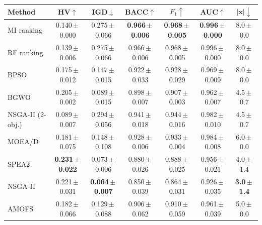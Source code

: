 \begin{tabular}{lcccccc}
\toprule
Method & HV$\uparrow$ & IGD$\downarrow$ & BACC$\uparrow$ & $F_1\uparrow$ & AUC$\uparrow$ & $|\mathbf{x}|\downarrow$ \\
\midrule
MI ranking & 0.140\,$\pm$\,0.000 & 0.275\,$\pm$\,0.066 & \textbf{0.966\,$\pm$\,0.006} & \textbf{0.968\,$\pm$\,0.005} & \textbf{0.996\,$\pm$\,0.000} & 8.0\,$\pm$\,0.0 \\
RF ranking & 0.139\,$\pm$\,0.006 & 0.275\,$\pm$\,0.066 & 0.966\,$\pm$\,0.006 & 0.968\,$\pm$\,0.005 & 0.996\,$\pm$\,0.000 & 8.0\,$\pm$\,0.0 \\
BPSO & 0.175\,$\pm$\,0.012 & 0.147\,$\pm$\,0.015 & 0.922\,$\pm$\,0.033 & 0.928\,$\pm$\,0.029 & 0.969\,$\pm$\,0.009 & 8.0\,$\pm$\,0.0 \\
BGWO & 0.205\,$\pm$\,0.002 & 0.089\,$\pm$\,0.015 & 0.898\,$\pm$\,0.007 & 0.907\,$\pm$\,0.003 & 0.962\,$\pm$\,0.007 & 4.5\,$\pm$\,0.7 \\
NSGA-II (2-obj.) & 0.089\,$\pm$\,0.007 & 0.294\,$\pm$\,0.056 & 0.941\,$\pm$\,0.018 & 0.944\,$\pm$\,0.016 & 0.982\,$\pm$\,0.010 & 4.5\,$\pm$\,0.7 \\
MOEA/D & 0.181\,$\pm$\,0.075 & 0.148\,$\pm$\,0.108 & 0.928\,$\pm$\,0.006 & 0.933\,$\pm$\,0.004 & 0.984\,$\pm$\,0.008 & 6.0\,$\pm$\,0.0 \\
SPEA2 & \textbf{0.231\,$\pm$\,0.022} & 0.073\,$\pm$\,0.006 & 0.880\,$\pm$\,0.026 & 0.888\,$\pm$\,0.025 & 0.956\,$\pm$\,0.021 & 4.0\,$\pm$\,1.4 \\
NSGA-II & 0.221\,$\pm$\,0.031 & \textbf{0.064\,$\pm$\,0.007} & 0.850\,$\pm$\,0.039 & 0.864\,$\pm$\,0.031 & 0.926\,$\pm$\,0.035 & \textbf{3.0\,$\pm$\,1.4} \\
AMOFS & 0.182\,$\pm$\,0.066 & 0.129\,$\pm$\,0.088 & 0.906\,$\pm$\,0.062 & 0.910\,$\pm$\,0.059 & 0.961\,$\pm$\,0.039 & 5.0\,$\pm$\,0.0 \\
\bottomrule
\end{tabular}
